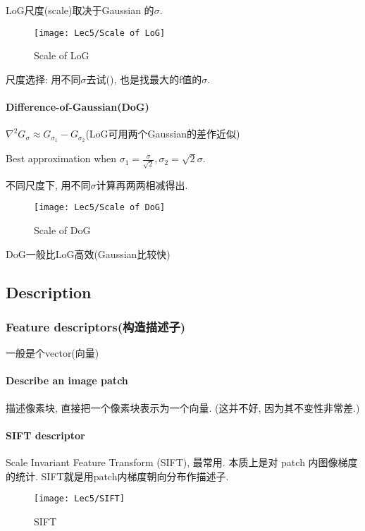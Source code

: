 LoG尺度(scale)取决于Gaussian 的$\sigma$.
\begin{figure}[H]
    \centering
    \texttt{[image: Lec5/Scale of LoG]}
    \caption{Scale of LoG}
\end{figure}


尺度选择: 用不同$\sigma$去试(), 也是找最大的f值的$\sigma$.

\paragraph{Difference-of-Gaussian(DoG)} $\nabla^2 G_{\sigma}\approx G_{\sigma_1}-G_{\sigma_2}$(LoG可用两个Gaussian的差作近似) 

Best approximation when $\sigma_1=\frac{\sigma}{\sqrt{2}}, \sigma_2=\sqrt{2}\sigma$.

不同尺度下, 用不同$\sigma$计算再两两相减得出. 
\begin{figure}[H]
    \centering
    \texttt{[image: Lec5/Scale of DoG]}
    \caption{Scale of DoG}
\end{figure}

DoG一般比LoG高效(Gaussian比较快)

\subsection{Description}

\subsubsection{Feature descriptors(构造描述子)}
一般是个vector(向量)
\paragraph{Describe an image patch} 描述像素块, 直接把一个像素块表示为一个向量. (这并不好, 因为其不变性非常差.)

\paragraph{SIFT descriptor}Scale Invariant Feature Transform (SIFT), 最常用. 本质上是对 patch 内图像梯度的统计. SIFT就是用patch内梯度朝向分布作描述子. 
\begin{figure}[H]
    \centering
    \texttt{[image: Lec5/SIFT]}
    \caption{SIFT}
\end{figure}


